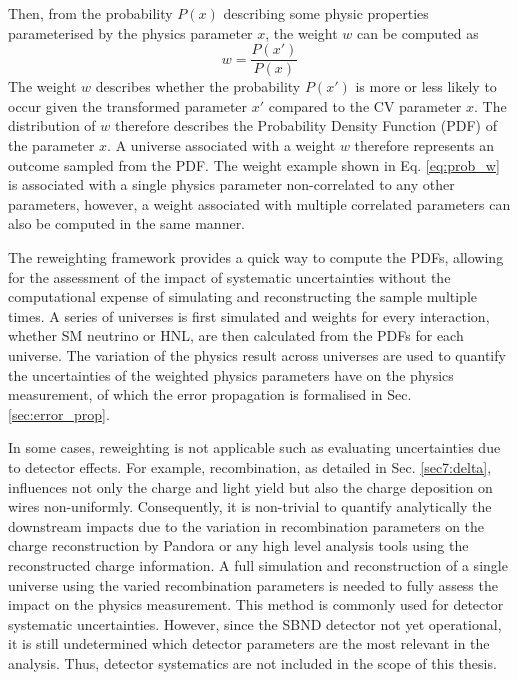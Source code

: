 
Then, from the probability $P(x)$ describing some physic properties parameterised by the physics parameter $x$, the weight $w$ can be computed as
\begin{equation}
\label{eq:prob_w}
	w = \frac{P(x')}{P(x)}
\end{equation}
The weight $w$ describes whether the probability $P(x')$ is more or less likely to occur given the transformed parameter $x'$ compared to the CV parameter $x$.
The distribution of $w$ therefore describes the Probability Density Function (PDF) of the parameter $x$.
A universe associated with a weight $w$ therefore represents an outcome sampled from the PDF.
The weight example shown in Eq. \ref{eq:prob_w} is associated with a single physics parameter non-correlated to any other parameters, however, a weight associated with multiple correlated parameters can also be computed in the same manner.

The reweighting framework provides a quick way to compute the PDFs, allowing for the assessment of the impact of systematic uncertainties without the computational expense of simulating and reconstructing the sample multiple times.
A series of universes is first simulated and weights for every interaction, whether SM neutrino or HNL, are then calculated from the PDFs for each universe.
The variation of the physics result across universes are used to quantify the uncertainties of the weighted physics parameters have on the physics measurement, of which the error propagation is formalised in Sec. \ref{sec:error_prop}.  

In some cases, reweighting is not applicable such as evaluating uncertainties due to detector effects.
For example, recombination, as detailed in Sec. \ref{sec7:delta}, influences not only the charge and light yield but also the charge deposition on wires non-uniformly. 
Consequently, it is non-trivial to quantify analytically the downstream impacts due to the variation in recombination parameters on the charge reconstruction by Pandora or any high level analysis tools using the reconstructed charge information.
A full simulation and reconstruction of a single universe using the varied recombination parameters is needed to fully assess the impact on the physics measurement. 
This method is commonly used for detector systematic uncertainties.
However, since the SBND detector not yet operational, it is still undetermined which detector parameters are the most relevant in the analysis.
Thus, detector systematics are not included in the scope of this thesis.


